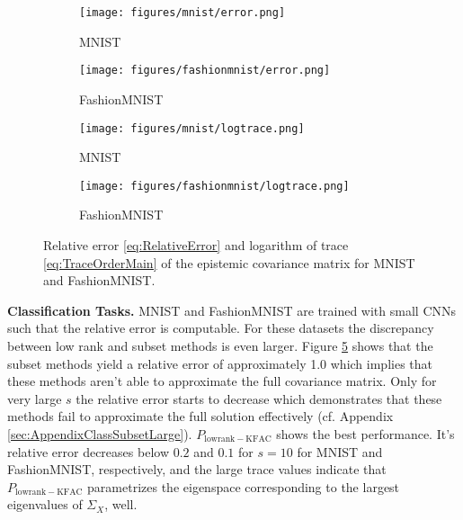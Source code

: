 \begin{figure}[!t]
    \centering
     \begin{subfigure}{0.23\textwidth}
        \centering
        \texttt{[image: figures/mnist/error.png]}
        \caption{MNIST}
        \label{subfig:rel_error_mnist}
    \end{subfigure}
    \hfill
    \begin{subfigure}{0.23\textwidth}
        \centering
        \texttt{[image: figures/fashionmnist/error.png]}
        \caption{FashionMNIST}
        \label{subfig:rel_error_fashionmnist}
    \end{subfigure}

    \vspace{0.25cm}
    
    \begin{subfigure}{0.23\textwidth}
        \centering
        \texttt{[image: figures/mnist/logtrace.png]}
        \caption{MNIST}
        \label{fig:mnist}
    \end{subfigure}
    \hfill
    \begin{subfigure}{0.23\textwidth}
        \centering
        \texttt{[image: figures/fashionmnist/logtrace.png]}
        \caption{FashionMNIST}
        \label{fig:fashionmnist}
    \end{subfigure}        
    \caption{Relative error \eqref{eq:RelativeError} and logarithm of trace \eqref{eq:TraceOrderMain} of the epistemic covariance matrix for MNIST and FashionMNIST.}
    \label{fig:MNIST_plots}
\end{figure}


\textbf{Classification Tasks.} MNIST and FashionMNIST are trained with small CNNs such that the relative error is computable. For these datasets the discrepancy between low rank and subset methods is even larger. Figure \ref{fig:MNIST_plots} shows that the subset methods yield a relative error of approximately 1.0 which implies that these methods aren't able to approximate the full covariance matrix. Only for very large $s$ the relative error starts to decrease which demonstrates that these methods fail to approximate the full solution effectively (cf. Appendix \ref{sec:AppendixClassSubsetLarge}). $P_{\mathrm{lowrank-KFAC}}$ shows the best performance. It's relative error decreases below $0.2$ and $0.1$ for $s=10$ for MNIST and FashionMNIST, respectively, and the large trace values indicate that $P_{\mathrm{lowrank-KFAC}}$ parametrizes the eigenspace corresponding to the largest eigenvalues of $\Sigma_X$, well. 

